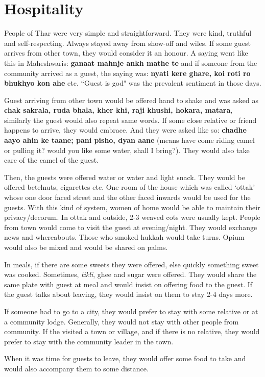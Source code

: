 \chapter{Hospitality}
People of Thar were very simple and straightforward. They were kind, truthful
and self-respecting. Always stayed away from show-off and wiles. If some guest
arrives from other town, they would consider it an honour. A saying went like
this in Maheshwaris: \textbf{ganaat mahnje ankh mathe te} and if someone from
the community arrived as a guest, the saying was: \textbf{nyati kere ghare, koi
roti ro bhukhyo kon ahe} etc. ``Guest is god" was the prevalent sentiment in
those days.

Guest arriving from other town would be offered hand to shake and was asked as
\textbf{chak sakrala, ruda bhala, kher khi, raji khushi, hokara, matara},
similarly the guest would also repeat same words. If some close relative or
friend happens to arrive, they would embrace. And they were asked like so:
\textbf{chadhe aayo ahin ke taane; pani pisho, dyan aane} (means have come
riding camel or pulling it? would you like some water, shall I bring?). They
would also take care of the camel of the guest.

Then, the guests were offered water or water and light snack. They would be
offered betelnuts, cigarettes etc. One room of the house which was called
`ottak' whose one door faced street and the other faced inwards would be used
for the guests. With this kind of system, women of home would be able to
maintain their privacy/decorum. In ottak and outside, 2-3 weaved cots were
usually kept. People from town would come to visit the guest at evening/night.
They would exchange news and whereabouts. Those who smoked hukkah would take
turns. Opium would also be mixed and would be shared on palms.

In meals, if there are some sweets they were offered, else quickly something
sweet was cooked. Sometimes, \textit{tikli}, ghee and sugar were offered. They
would share the same plate with guest at meal and would insist on offering food
to the guest. If the guest talks about leaving, they would insist on them to
stay 2-4 days more.

If someone had to go to a city, they would prefer to stay with some relative or
at a community lodge. Generally, they would not stay with other people from
community. If the visited a town or village, and if there is no relative, they
would prefer to stay with the community leader in the town.

When it was time for guests to leave, they would offer some food to take and
would also accompany them to some distance.
